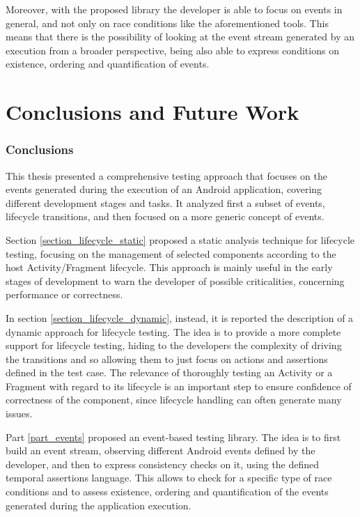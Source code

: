 \documentclass[11pt,a4paper,notitlepage]{article}
\begin{document}
Moreover, with the proposed library the developer is able to focus on events in general, and not only on race conditions like the aforementioned tools. This means that there is the possibility of looking at the event stream generated by an execution from a broader perspective, being also able to express conditions on existence, ordering and quantification of events.



\newpage
\part{Conclusions and Future Work}\label{part_conclusion}

\section{Conclusions}
This thesis presented a comprehensive testing approach that focuses on the events generated during the execution of an Android application, covering different development stages and tasks. It analyzed first a subset of events, lifecycle transitions, and then focused on a more generic concept of events.

Section \ref{section_lifecycle_static} proposed a static analysis technique for lifecycle testing, focusing on the management of selected components according to the host Activity/Fragment lifecycle. This approach is mainly useful in the early stages of development to warn the developer of possible criticalities, concerning performance or correctness.

In section \ref{section_lifecycle_dynamic}, instead, it is reported the description of a dynamic approach for lifecycle testing. The idea is to provide a more complete support for lifecycle testing, hiding to the developers the complexity of driving the transitions and so allowing them to just focus on actions and assertions defined in the test case. The relevance of thoroughly testing an Activity or a Fragment with regard to its lifecycle is an important step to ensure confidence of correctness of the component, since lifecycle handling can often generate many issues.

Part \ref{part_events} proposed an event-based testing library. The idea is to first build an event stream, observing different Android events defined by the developer, and then to express consistency checks on it, using the defined temporal assertions language. This allows to check for a specific type of race conditions and to assess existence, ordering and quantification of the events generated during the application execution.
\end{document}
